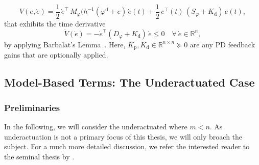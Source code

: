 \begin{equation}
    V(e, \dot{e}) = \frac{1}{2} \, \dot{e}^\top \, M_\varphi(h^{-1}(\varphi^\mathrm{d}+e) \, \dot{e}(t) + \frac{1}{2} \, e^\top(t) \, \left ( S_\varphi + K_\mathrm{d} \right ) \, e(t),
\end{equation}
that exhibits the time derivative
\begin{equation}
    \dot{V}(\dot{e}) = -\dot{e}^\top \left (D_\varphi + K_\mathrm{d} \right ) \, \dot{e} \leq 0 \quad \forall \: \dot{e} \in \mathbb{R}^n,
\end{equation}
by applying Barbalat's Lemma~\citep{slotine1991applied, della2020model}.
Here, $K_\mathrm{p}, K_\mathrm{d} \in \mathbb{R}^{n \times n} \succeq 0$ are any PD feedback gains that are optionally applied.


\subsection{Model-Based Terms: The Underactuated Case}\label{sub:background:model_based_control:model_based_terms_underactuated}

\subsubsection{Preliminaries}

In the following, we will consider the underactuated where $m < n$. As underactuation is not a primary focus of this thesis, we will only broach the subject. For a much more detailed discussion, we refer the interested reader to the seminal thesis by \citet{pustina2025analysis}.

